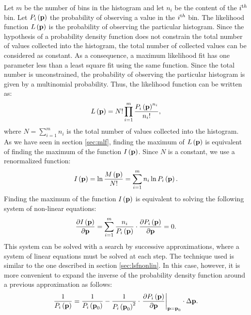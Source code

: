Let $m$ be the number of bins in the histogram and let $n_i$ be
the content of the $i^{\mathop{\textrm th}}$ bin. Let $P_i\left({\textbf
p}\right)$ the probability of observing a value in the
$i^{\mathop{\textrm th}}$ bin. The likelihood function $L\left({\textbf
p}\right)$ is the probability of observing the particular
histogram. Since the hypothesis of a probability density function
does not constrain the total number of values collected into the
histogram, the total number of collected values can be considered
as constant. As a consequence, a maximum likelihood fit has one
parameter less than a least square fit using the same function.
Since the total number is unconstrained, the probability of
observing the particular histogram is given by a multinomial
probability. Thus, the likelihood function can be written as:
\begin{equation}
\label{eq:mlfhist}
  L\left({\textbf p}\right)=N!\prod_{i=1}^m{\displaystyle P_i\left({\textbf
  p}\right)^{n_i}\over\displaystyle n_i!},
\end{equation}
where $N=\sum_{i=1}^m n_i$ is the total number of values collected
into the histogram. As we have seen in section \ref{sec:mlf},
finding the maximum of $L\left({\textbf p}\right)$ is equivalent of
finding the maximum of the function $I\left({\textbf p}\right)$. Since
$N$ is a constant, we use a renormalized function:
\begin{equation}
\label{eq:mlogfhist} I\left({\textbf p}\right)=\ln {\displaystyle
M\left({\textbf p}\right) \over\displaystyle N!}=\sum_{i=1}^m n_i \ln
P_i\left({\textbf p}\right).
\end{equation}
Finding the maximum of the function $I\left({\textbf p}\right)$ is
equivalent to solving the following system of non-linear
equations:
\begin{equation}
\label{eq:mlfsys} {\displaystyle\partial I\left({\textbf p}\right)
\over\displaystyle\partial{\textbf p}}=\sum_{i=1}^m {\displaystyle n_i
\over\displaystyle P_i\left({\textbf
p}\right)}\cdot{\displaystyle\partial P_i\left({\textbf p}\right)
\over\displaystyle\partial{\textbf p}}=0.
\end{equation}
This system can be solved with a search by successive
approximations, where a system of linear equations must be solved
at each step. The technique used is similar to the one described
in section \ref{sec:lsfnonlin}. In this case, however, it is more
convenient to expand the inverse of the probability density
function around a previous approximation as follows:
\begin{equation}
{\displaystyle 1\over\displaystyle P_i\left({\textbf p}\right)} =
{\displaystyle 1\over\displaystyle P_i\left({\textbf p}_0\right)} -
{\displaystyle 1\over\displaystyle P_i\left({\textbf
p}_0\right)^2}\cdot \left.{\displaystyle\partial P_i\left({\textbf
p}\right) \over\displaystyle\partial{\textbf p}}\right|_{{\textbf p}={\textbf
p}_0}\cdot\Delta{\textbf p}.
\end{equation}
